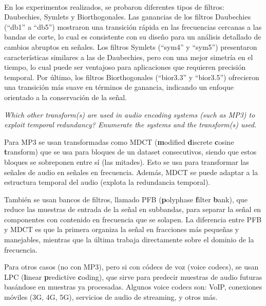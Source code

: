 \documentclass[11pt]{article}
\begin{document}
    \begin{center}
    \end{center}
    { \hspace*{\fill} \\}
    
    En los experimentos realizados, se probaron diferentes tipos de filtros:
Daubechies, Symlets y Biorthogonales. Las ganancias de los filtros
Daubechies (``db1'' a ``db5'') mostraron una transición rápida en las
frecuencias cercanas a las bandas de corte, lo cual es consistente con
su diseño para un análisis detallado de cambios abruptos en señales. Los
filtros Symlets (``sym4'' y ``sym5'') presentaron características
similares a las de Daubechies, pero con una mejor simetría en el tiempo,
lo cual puede ser ventajoso para aplicaciones que requieren precisión
temporal. Por último, los filtros Biorthogonales (``bior3.3'' y
``bior3.5'') ofrecieron una transición más suave en términos de
ganancia, indicando un enfoque orientado a la conservación de la señal.

    \emph{Which other transform(s) are used in audio encoding systems (such
as MP3) to exploit temporal redundancy? Enumerate the systems and the
transform(s) used.}

    Para MP3 se usan transformadas como MDCT (\textbf{m}odified
\textbf{d}iscrete \textbf{c}osine \textbf{t}ransform) que se usa para
bloques de un dataset consecutivos, siendo que estos bloques se
sobreponen entre sí (las mitades). Esto se usa para transformar las
señales de audio en señales en frecuencia. Además, MDCT se puede adaptar
a la estructura temporal del audio (explota la redundancia temporal).

También se usan bancos de filtros, llamado PFB (\textbf{p}olyphase
\textbf{f}ilter \textbf{b}ank), que reduce las muestras de entrada de la
señal en subbandas, para separar la señal en componentes con contenido
en frecuencia que se solapen. La diferencia entre PFB y MDCT es que la
primera organiza la señal en fracciones más pequeñas y manejables,
mientras que la última trabaja directamente sobre el dominio de la
frecuencia.

Para otros casos (no con MP3), pero si con códecs de voz (voice codecs),
se usan LPC (\textbf{l}inear \textbf{p}redictive \textbf{c}oding), que
sirve para predecir muestras de audio futuras basándose en muestras ya
procesadas. Algunos voice codecs son: VoIP, conexiones móviles (3G, 4G,
5G), servicios de audio de streaming, y otros más.
\end{document}
